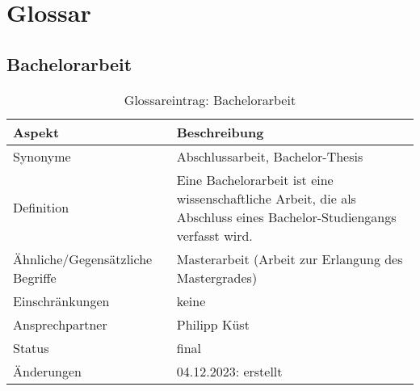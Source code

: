 \chapter{Glossar}\label{ch:glossar}
\section{Bachelorarbeit}\label{sec:glossar_bachelorarbeit}
\begin{table}[H]\label{tab:glossar_bachelorarbeit}
    \begin{tabularx}{\textwidth}{|l|X|}
        \hline
        \textbf{Aspekt} & \textbf{Beschreibung} \\
        \hline
        Synonyme & Abschlussarbeit, Bachelor-Thesis \\
        \hline
        Definition & Eine Bachelorarbeit ist eine wissenschaftliche Arbeit, die als Abschluss eines Bachelor-Studiengangs verfasst wird. \\
        \hline
        Ähnliche/Gegensätzliche Begriffe & Masterarbeit (Arbeit zur Erlangung des Mastergrades) \\
        \hline
        Einschränkungen & keine\\
        \hline
        Ansprechpartner & Philipp Küst \\
        \hline
        Status & final \\
        \hline
        Änderungen & 04.12.2023: erstellt \\
        \hline
    \end{tabularx}
    \caption{Glossareintrag: Bachelorarbeit}
\end{table}

